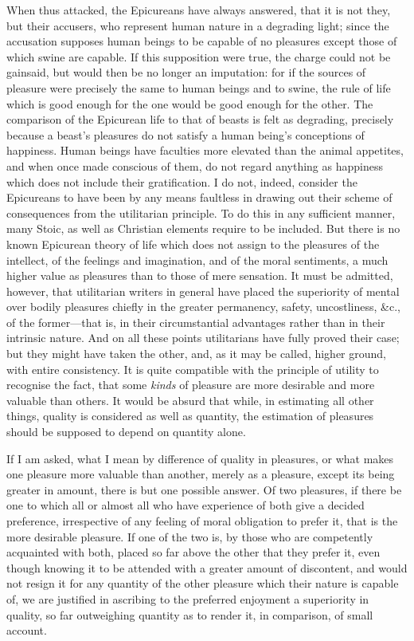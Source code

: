 When thus attacked, the Epicureans have always answered, that it is
not they, but their accusers, who represent human nature in a
degrading light; since the accusation supposes human beings to be
capable of no pleasures except those of which swine are capable. If
this supposition were true, the charge could not be 
gainsaid, but would then be no longer an imputation: for if the
sources of pleasure were precisely the same to human beings and to
swine, the rule of life which is good enough for the one would be good
enough for the other. The comparison of the Epicurean life to that
of beasts is felt as degrading, precisely because a beast's pleasures
do not satisfy a human being's conceptions of happiness. Human beings
have faculties more elevated than the animal appetites, and when once
made conscious of them, do not regard anything as happiness which
does not include their gratification. I do not, indeed, consider the
Epicureans to have been by any means faultless in drawing out their
scheme of consequences from the utilitarian principle. To do this in
any sufficient manner, many Stoic, as well as Christian elements
require to be included. But there is no known Epicurean theory of life
which does not assign to the pleasures of the intellect, of the
feelings and imagination, and of the moral sentiments, a much higher
value as pleasures than to those of mere sensation. It must be
admitted, however, that utilitarian writers in general have placed the
superiority of mental over bodily pleasures chiefly in the greater
permanency, safety, uncostliness, \&c., of the for\-mer---that is, in
their circumstantial advantages rather than in their intrinsic nature.
And on all these points utilitarians have fully proved their case;
but they might have taken the other, and, as it may be called, higher
ground, with entire consistency. It is quite compatible with the
principle of utility to recognise the fact, that some \textit{kinds}
of pleasure are more desirable and more valuable than others. It would
be absurd that while, in estimating all other things, quality is
 considered as well as quantity, the estimation of pleasures
should be supposed to depend on quantity alone.

If I am asked, what I mean by difference of quality in pleasures, or
what makes one pleasure more valuable than another, merely as a
pleasure, except its being greater in amount, there is but one
possible answer. Of two pleasures, if there be one to which all or
almost all who have experience of both give a decided preference,
irrespective of any feeling of moral obligation to prefer it, that is
the more desirable pleasure. If one of the two is, by those who are
competently acquainted with both, placed so far above the other that
they prefer it, even though knowing it to be attended with a greater
amount of discontent, and would not resign it for any quantity of the
other pleasure which their nature is capable of, we are justified in
ascribing to the preferred enjoyment a superiority in quality, so far
outweighing quantity as to render it, in comparison, of small account.

